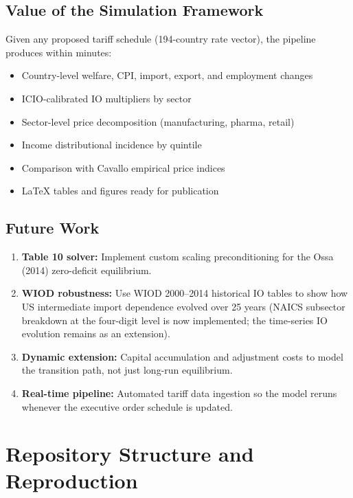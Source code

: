 \documentclass[12pt]{article}
\begin{document}
\subsection{Value of the Simulation Framework}

Given any proposed tariff schedule (194-country rate vector), the pipeline
produces within minutes:

\begin{itemize}
    \item Country-level welfare, CPI, import, export, and employment changes
    \item ICIO-calibrated IO multipliers by sector
    \item Sector-level price decomposition (manufacturing, pharma, retail)
    \item Income distributional incidence by quintile
    \item Comparison with Cavallo empirical price indices
    \item LaTeX tables and figures ready for publication
\end{itemize}

\subsection{Future Work}

\begin{enumerate}
    \item \textbf{Table 10 solver:} Implement custom scaling preconditioning
    for the Ossa (2014) zero-deficit equilibrium.
    \item \textbf{WIOD robustness:} Use WIOD 2000--2014 historical IO tables
    to show how US intermediate import dependence evolved over 25 years
    (NAICS subsector breakdown at the four-digit level is now implemented;
    the time-series IO evolution remains as an extension).
    \item \textbf{Dynamic extension:} Capital accumulation and adjustment costs
    to model the transition path, not just long-run equilibrium.
    \item \textbf{Real-time pipeline:} Automated tariff data ingestion so the
    model reruns whenever the executive order schedule is updated.
\end{enumerate}

\newpage
\appendix

\section{Repository Structure and Reproduction}
\end{document}
